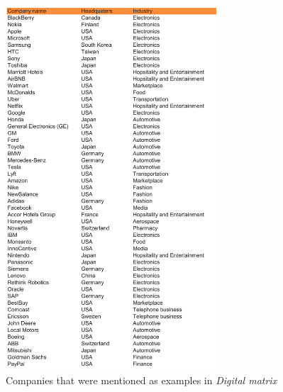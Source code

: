 \documentclass[a4]{scrartcl}
\begin{document}
\begin{figure}[h!]
	\centering
	\includegraphics[width=0.7\textwidth]{images/DM_Table.png}
	\caption{Companies that were mentioned as examples in \textit{Digital matrix} \cite{digitalmatrix}}
	\label{fig:DM_table}
\end{figure}






	
	
	
	
	
	
\end{document}
